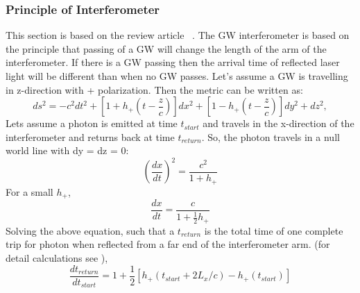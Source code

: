 \documentclass{ttuthes2007}
\begin{document}
\subsubsection{Principle of Interferometer}
This section is based on the review article ~\citet{Sathyaprakash_2009}. The
\ac{GW} interferometer is based on the principle that passing of a \ac{GW} will
change the length of the arm of the interferometer. If there is a \ac{GW}
passing then the arrival time of reflected laser light will be different than when no
\ac{GW} passes. Let's assume a \ac{GW} is travelling in z-direction with +
polarization. Then the metric can be written as:
\begin{equation}
ds^2= -c^2dt^2+[1+h_+(t-\frac{z}{c})]dx^2+[1-h_+(t-\frac{z}{c})]dy^2+dz^2,
\end{equation}
Lets assume a photon is emitted at time $t_{start}$ and travels
in the x-direction of the interferometer and returns back at time $t_{return}$. So,
the photon travels in a null world line with dy = dz = 0:
\begin{equation}
\left(\frac{dx}{dt}\right)^2=\frac{c^2}{1+h_+}
\end{equation}
For a small $h_+$,
\begin{equation}
\frac{dx}{dt}=\frac{c}{1+\frac{1}{2}h_+}
\end{equation}
Solving the above equation, such that a $t_{return}$ is the total time of one
complete trip for photon when reflected from a far end of the interferometer
arm. (for detail calculations see \cite{Schutz:1985jx}),
\begin{equation}
\frac{dt_{return}}{dt_{start}}=1+\frac{1}{2}[h_+(t_{start}+2L_x/c)-h_+(t_{start})]
\end{equation}
\end{document}

